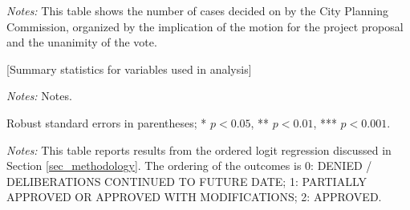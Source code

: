 \documentclass[12pt,english,hyperfootnotes=false,hidelinks]{article}
\begin{document}
\begin{table}[H]
\caption{Summary of Motion Outcomes and Vote Results}
\vspace{0.2cm}
\label{tab_result_unanimity}
\begin{adjustbox}{max width=\textwidth}
\begin{threeparttable}

\begin{tablenotes}

\item {\textit{Notes: } This table shows the number of cases decided on by the City Planning Commission, organized by the implication of the motion for the project proposal and the unanimity of the vote.}
\end{tablenotes}
\end{threeparttable}
\end{adjustbox}
\end{table}

\pagebreak

\begin{table}[H]
\caption{Summary Statistics for Case Features}
\vspace{0.2cm}
\label{tab_summary_stats}
\begin{adjustbox}{max width=\textwidth}
\begin{threeparttable}
\begin{center}
[Summary statistics for variables used in analysis]
\end{center}
\begin{tablenotes}
\item {\textit{Notes: } Notes.}
\end{tablenotes}
\end{threeparttable}
\end{adjustbox}
\end{table}

\pagebreak

\begin{table}[H]
  \caption{Ordered Logit Regression Results}
  \vspace{0.2cm}
  \label{tab_ologit_results}
  \begin{adjustbox}{max width=\textwidth}
    \begin{threeparttable}
      \centering
      
\begin{tablenotes}[flushleft]
        \footnotesize
        \item Robust standard errors in parentheses; * $p<0.05$, ** $p<0.01$, *** $p<0.001$.
        \item \textit{Notes:} This table reports results from the ordered logit regression 
        discussed in Section \ref{sec_methodology}. The ordering of the outcomes is 
        0: DENIED / DELIBERATIONS CONTINUED TO FUTURE DATE; 
        1: PARTIALLY APPROVED OR APPROVED WITH MODIFICATIONS; 
        2: APPROVED.
      \end{tablenotes}
    \end{threeparttable}
  \end{adjustbox}
\end{table}
\end{document}
